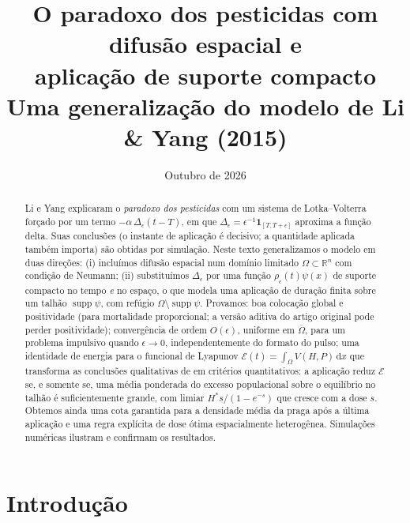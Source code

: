 \documentclass[11pt,a4paper]{article}
\title{O paradoxo dos pesticidas com difusão espacial e\\ aplicação de suporte compacto\\[4pt]
\large Uma generalização do modelo de Li \& Yang (2015)}
\author{}
\date{Outubro de 2026}
\numberwithin{equation}{section}
\theoremstyle{definition}
\theoremstyle{remark}
\newcommand{\R}{\mathbb{R}}
\newcommand{\E}{\mathcal{E}}
\newcommand{\dd}{\,\mathrm{d}}
\newcommand{\Hs}{H^{*}}
\begin{document}
\maketitle

\begin{abstract}
Li e Yang \cite{LiYang} explicaram o \emph{paradoxo dos pesticidas} com um sistema de
Lotka--Volterra forçado por um termo $-\alpha\,\Delta_\epsilon(t-T)$, em que
$\Delta_\epsilon=\epsilon^{-1}\mathbf 1_{[T,T+\epsilon]}$ aproxima a função delta. Suas
conclusões (o instante de aplicação é decisivo; a quantidade aplicada também importa) são
obtidas por simulação. Neste texto generalizamos o modelo em duas direções:
(i) incluímos difusão espacial num domínio limitado $\Omega\subset\R^n$ com
condição de Neumann; (ii) substituímos $\Delta_\epsilon$ por uma função
$\rho_\epsilon(t)\psi(x)$ de suporte compacto no tempo \emph{e} no espaço, o que modela
uma aplicação de duração finita sobre um talhão $\operatorname{supp}\psi$, com refúgio
$\Omega\setminus\operatorname{supp}\psi$. Provamos: boa colocação global e positividade
(para mortalidade proporcional; a versão aditiva do artigo original pode perder
positividade); convergência de ordem $O(\epsilon)$, uniforme em $\overline\Omega$, para um
problema impulsivo quando $\epsilon\to0$, independentemente do formato do pulso; uma
identidade de energia para o funcional de Lyapunov $\E(t)=\int_\Omega V(H,P)\dd x$ que
transforma as conclusões qualitativas de \cite{LiYang} em critérios quantitativos:
a aplicação reduz $\E$ se, e somente se, uma média ponderada do excesso populacional
sobre o equilíbrio no talhão é suficientemente grande, com limiar
$\Hs s/(1-e^{-s})$ que cresce com a dose $s$. Obtemos ainda uma cota garantida para a
densidade média da praga após a última aplicação e uma regra explícita de dose ótima
espacialmente heterogênea. Simulações numéricas ilustram e confirmam os resultados.
\end{abstract}

\tableofcontents

\section{Introdução}
\end{document}
